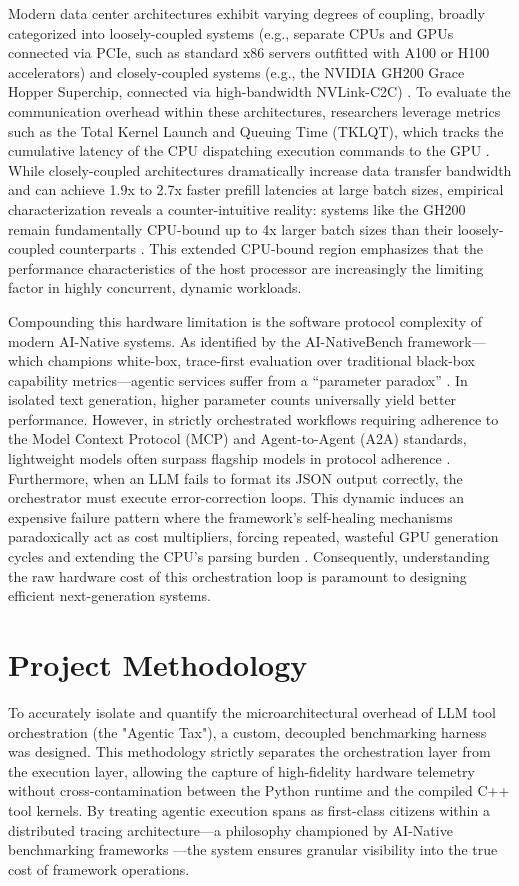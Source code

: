 \documentclass[10pt, letterpaper]{article}
\begin{document}
Modern data center architectures exhibit varying degrees of coupling, broadly categorized into loosely-coupled systems (e.g., separate CPUs and GPUs connected via PCIe, such as standard x86 servers outfitted with A100 or H100 accelerators) and closely-coupled systems (e.g., the NVIDIA GH200 Grace Hopper Superchip, connected via high-bandwidth NVLink-C2C) \cite{coupled_architectures}. To evaluate the communication overhead within these architectures, researchers leverage metrics such as the Total Kernel Launch and Queuing Time (TKLQT), which tracks the cumulative latency of the CPU dispatching execution commands to the GPU \cite{coupled_architectures}. While closely-coupled architectures dramatically increase data transfer bandwidth and can achieve 1.9x to 2.7x faster prefill latencies at large batch sizes, empirical characterization reveals a counter-intuitive reality: systems like the GH200 remain fundamentally CPU-bound up to 4x larger batch sizes than their loosely-coupled counterparts \cite{coupled_architectures}. This extended CPU-bound region emphasizes that the performance characteristics of the host processor are increasingly the limiting factor in highly concurrent, dynamic workloads.

Compounding this hardware limitation is the software protocol complexity of modern AI-Native systems. As identified by the AI-NativeBench framework---which champions white-box, trace-first evaluation over traditional black-box capability metrics---agentic services suffer from a ``parameter paradox'' \cite{ai_nativebench}. In isolated text generation, higher parameter counts universally yield better performance. However, in strictly orchestrated workflows requiring adherence to the Model Context Protocol (MCP) and Agent-to-Agent (A2A) standards, lightweight models often surpass flagship models in protocol adherence \cite{ai_nativebench}. Furthermore, when an LLM fails to format its JSON output correctly, the orchestrator must execute error-correction loops. This dynamic induces an expensive failure pattern where the framework's self-healing mechanisms paradoxically act as cost multipliers, forcing repeated, wasteful GPU generation cycles and extending the CPU's parsing burden \cite{ai_nativebench}. Consequently, understanding the raw hardware cost of this orchestration loop is paramount to designing efficient next-generation systems.

\section{Project Methodology}
To accurately isolate and quantify the microarchitectural overhead of LLM tool orchestration (the "Agentic Tax"), a custom, decoupled benchmarking harness was designed. This methodology strictly separates the orchestration layer from the execution layer, allowing the capture of high-fidelity hardware telemetry without cross-contamination between the Python runtime and the compiled C++ tool kernels. By treating agentic execution spans as first-class citizens within a distributed tracing architecture---a philosophy championed by AI-Native benchmarking frameworks \cite{ai_nativebench}---the system ensures granular visibility into the true cost of framework operations.
\end{document}
